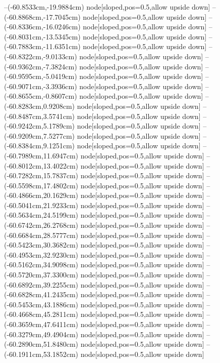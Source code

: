 --(-60.8533cm,-19.9884cm) node[sloped,pos=0.5,allow upside down]{\ArrowIn}
--(-60.8868cm,-17.7045cm) node[sloped,pos=0.5,allow upside down]{\ArrowIn}
--(-60.8336cm,-16.0246cm) node[sloped,pos=0.5,allow upside down]{\ArrowIn}
--(-60.8031cm,-13.5345cm) node[sloped,pos=0.5,allow upside down]{\ArrowIn}
--(-60.7883cm,-11.6351cm) node[sloped,pos=0.5,allow upside down]{\ArrowIn}
--(-60.8322cm,-9.0133cm) node[sloped,pos=0.5,allow upside down]{\ArrowIn}
--(-60.9362cm,-7.3824cm) node[sloped,pos=0.5,allow upside down]{\ArrowIn}
--(-60.9595cm,-5.0419cm) node[sloped,pos=0.5,allow upside down]{\ArrowIn}
--(-60.9071cm,-3.3936cm) node[sloped,pos=0.5,allow upside down]{\ArrowIn}
--(-60.8655cm,-0.8607cm) node[sloped,pos=0.5,allow upside down]{\ArrowIn}
--(-60.8283cm,0.9208cm) node[sloped,pos=0.5,allow upside down]{\ArrowIn}
--(-60.8487cm,3.5741cm) node[sloped,pos=0.5,allow upside down]{\ArrowIn}
--(-60.9242cm,5.1789cm) node[sloped,pos=0.5,allow upside down]{\ArrowIn}
--(-60.9209cm,7.5277cm) node[sloped,pos=0.5,allow upside down]{\ArrowIn}
--(-60.8384cm,9.1251cm) node[sloped,pos=0.5,allow upside down]{\ArrowIn}
--(-60.7989cm,11.6947cm) node[sloped,pos=0.5,allow upside down]{\ArrowIn}
--(-60.8012cm,13.4022cm) node[sloped,pos=0.5,allow upside down]{\ArrowIn}
--(-60.7282cm,15.7837cm) node[sloped,pos=0.5,allow upside down]{\ArrowIn}
--(-60.5598cm,17.4802cm) node[sloped,pos=0.5,allow upside down]{\ArrowIn}
--(-60.4866cm,20.1629cm) node[sloped,pos=0.5,allow upside down]{\ArrowIn}
--(-60.5041cm,21.9233cm) node[sloped,pos=0.5,allow upside down]{\ArrowIn}
--(-60.5634cm,24.5199cm) node[sloped,pos=0.5,allow upside down]{\ArrowIn}
--(-60.6742cm,26.2768cm) node[sloped,pos=0.5,allow upside down]{\ArrowIn}
--(-60.6684cm,28.5777cm) node[sloped,pos=0.5,allow upside down]{\ArrowIn}
--(-60.5423cm,30.3682cm) node[sloped,pos=0.5,allow upside down]{\ArrowIn}
--(-60.4953cm,32.9230cm) node[sloped,pos=0.5,allow upside down]{\ArrowIn}
--(-60.5162cm,34.9098cm) node[sloped,pos=0.5,allow upside down]{\ArrowIn}
--(-60.5720cm,37.3300cm) node[sloped,pos=0.5,allow upside down]{\ArrowIn}
--(-60.6892cm,39.2255cm) node[sloped,pos=0.5,allow upside down]{\ArrowIn}
--(-60.6828cm,41.2435cm) node[sloped,pos=0.5,allow upside down]{\ArrowIn}
--(-60.5453cm,43.1886cm) node[sloped,pos=0.5,allow upside down]{\ArrowIn}
--(-60.4668cm,45.2811cm) node[sloped,pos=0.5,allow upside down]{\ArrowIn}
--(-60.3659cm,47.6411cm) node[sloped,pos=0.5,allow upside down]{\ArrowIn}
--(-60.3279cm,49.4904cm) node[sloped,pos=0.5,allow upside down]{\ArrowIn}
--(-60.2890cm,51.8480cm) node[sloped,pos=0.5,allow upside down]{\ArrowIn}
--(-60.1911cm,53.1852cm) node[sloped,pos=0.5,allow upside down]{\ArrowIn}

